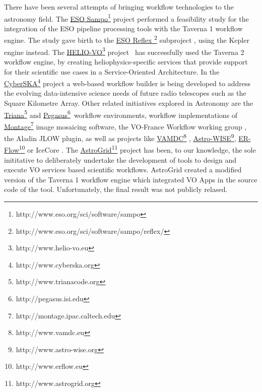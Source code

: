 \documentclass{aa}
\begin{document}
There have been several attempts of bringing workflow technologies to the astronomy field. The \href{http://www.eso.org/sci/software/sampo}{ESO Sampo}\footnote{http://www.eso.org/sci/software/sampo} project performed a feasibility study for the integration of the ESO pipeline processing tools with the Taverna 1 workflow engine. The study gave birth to the \href{http://www.eso.org/sci/software/sampo/reflex/}{ESO Reflex }\footnote{http://www.eso.org/sci/software/sampo/reflex/} subproject \citep{Hook2009}, using the Kepler engine \citep{Altintas2004} instead. The \href{http://www.helio-vo.eu/}{HELIO-VO}\footnote{http://www.helio-vo.eu} project~\textbf{\citep{Bentley2013}} has successfully used the Taverna 2 workflow engine, by creating heliophysics-specific services that provide support for their scientific use cases in a Service-Oriented Architecture. In the \href{http://www.cyberska.org}{CyberSKA}\footnote{http://www.cyberska.org} project \citep{Kiddle2011} a web-based workflow builder is being developed to address the evolving data-intensive science needs of future radio telescopes such as the Square Kilometre Array. Other related initiatives explored in Astronomy are the \href{http://www.trianacode.org}{Triana}\footnote{http://www.trianacode.org} \citep{Taylor2007} and \href{http://pegasus.isi.edu}{Pegasus}\footnote{http://pegasus.isi.edu}~\textbf{\citep{Deelman:2005:PFM:1239649.1239653}}workflow environments, workflow implementations of \href{http://montage.ipac.caltech.edu}{Montage}\footnote{http://montage.ipac.caltech.edu} image mosaicing software, the VO-France Workflow working group \citep{Schaaff2008}, the Aladin \citep{Bonnarel2000} JLOW plugin, as well as projects like \href{http://www.vamdc.eu}{VAMDC}\footnote{http://www.vamdc.eu} \citep{Walton2011}, \href{http://www.astro-wise.org}{Astro-WISE}\footnote{http://www.astro-wise.org}, \href{http://www.erflow.eu}{ER-Flow}\footnote{http://www.erflow.eu} or IceCore \citep{Maisala2012}. The \href{http://www.astrogrid.org}{AstroGrid}\footnote{http://www.astrogrid.org} project has been, to our knowledge, the sole inititative to deliberately undertake the development of tools to design and execute VO services based scientific workflows. AstroGrid created a modified version of the Taverna 1 workflow engine \citep{Benson2009, Walton2010} which integrated VO Apps in the source code of the tool. Unfortunately, the final result was not publicly relased.
\end{document}
